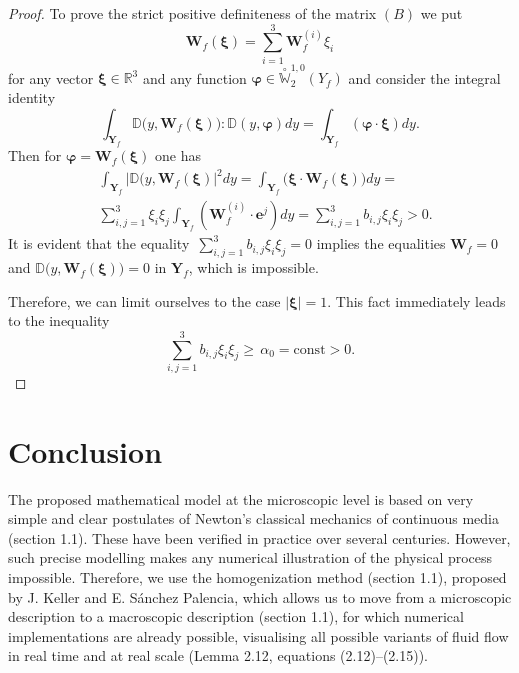 \documentclass{article}
\theoremstyle{plain}
\theoremstyle{definition}
\numberwithin{equation}{section}
\begin{document}
\begin{proof}
To prove the strict positive definiteness of the matrix $(B)$ we put
\begin{equation*}
\boldsymbol{W}_{f}(\boldsymbol{\xi})=\sum_{i=1}^{3}\boldsymbol{W}_{f}^{(i)}\xi_{i}
\end{equation*}
for any vector $\boldsymbol{\xi}\in\mathbb{R}^{3}$ and any function
$\boldsymbol{\varphi}\in\stackrel{\!\!\circ}{\mathbb{W}}^{1,0}_{2}({Y}_{f})$ and consider
the integral identity
\begin{equation}\label{eq5.18}
\int_{\textbf{Y}_{f}}\mathbb{D}\big(y,\boldsymbol{W}_{f}(\boldsymbol{\xi})\big):
\mathbb{D}(y,\boldsymbol{\varphi})dy=
\int_{\textbf{Y}_{f}}(\boldsymbol{\varphi}\cdot\boldsymbol{\xi})dy.
\end{equation}
Then for $\boldsymbol{\varphi}=\boldsymbol{W}_{f}(\boldsymbol{\xi})$ one has
\begin{equation}\label{eq5.19}
\begin{aligned}
& 
\int_{\textbf{Y}_{f}}|\mathbb{D}(y,\boldsymbol{W}_{f}(\boldsymbol{\xi})|^{2}dy=
\int_{\textbf{Y}_{f}}\big(\boldsymbol{\xi}\cdot\boldsymbol{W}_{f}(\boldsymbol{\xi})\big)dy=
\\
& \sum_{i,j=1}^{3}{\xi}_{i}{\xi}_{j}\int_{\textbf{Y}_{f}}(\boldsymbol{W}_{f}^{(i)}
\cdot\boldsymbol{e}^{j})dy=\sum_{i,j=1}^{3}{b}_{i,j}{\xi}_{i}{\xi}_{j}>0.
\end{aligned}
\end{equation}
It is evident that the equality $\displaystyle\,\sum_{i,j=1}^{3}{b}_{i,j}{\xi}_{i}{\xi}_{j}=0$
implies the equalities $\boldsymbol{W}_{f}=0$ and $\mathbb{D}\big(y,\boldsymbol{W}_{f}(\boldsymbol{\xi})\big)=0$ in $\textbf{Y}_{f}$, which is impossible.

Therefore, we can limit ourselves to the case $|\boldsymbol{\xi}|=1$. This fact immediately leads to the inequality
\begin{equation*}
\sum_{i,j=1}^{3}{b}_{i,j}{\xi}_{i}{\xi}_{j}\geqslant\,\alpha_{0}=\mbox{const}>0.
\end{equation*}
\end{proof}

\section{Conclusion}
The proposed mathematical model at the microscopic level is based on very simple and clear postulates of Newton's classical mechanics of continuous media (section 1.1). These have been verified in practice over several centuries. However, such precise modelling makes any numerical illustration of the physical process impossible. Therefore, we use the homogenization method (section 1.1), proposed by J. Keller and E. Sánchez Palencia, which allows us to move from a microscopic description to a macroscopic description (section 1.1), for which numerical implementations are already possible, visualising all possible variants of fluid flow in real time and at real scale (Lemma 2.12, equations (2.12)–(2.15)).
\end{document}
